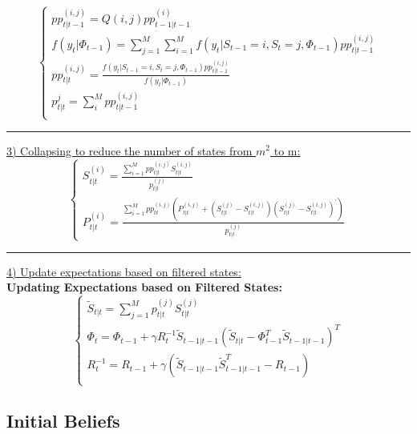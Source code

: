 \documentclass[12pt,reqno]{article}
\numberwithin{equation}{section}
\begin{document}
\begin{table}[H]
$$
\begin{cases}
pp_{t|t-1}^{(i,j)}=Q(i,j) pp_{t-1|t-1}^{(i)} \\
f(y_t|\Phi_{t-1}) = \sum_{j=1}^M \sum_{i=1}^M f(y_t | S_{t-1}=i, S_t=j, \Phi_{t-1} ) pp_{t|t-1}^{(i,j)} \\
pp_{t|t}^{(i,j)} = \frac{f(y_t | S_{t-1} = i, S_t = j, \Phi_{t-1}) pp_{t|t-1}^{(i,j)} } { f(y_t| \Phi_{t-1})} \\
p_{t|t}^{j} = \sum_{i}^M pp_{t|t-1}^{(i,j)}\\
\end{cases}
$$

\noindent\rule{\textwidth}{1pt}
\noindent
\underline{3) Collapsing to reduce the number of states from $m^2 $ to m:} \\
$$
\begin{cases}
{S}_{t|t}^{(i)} = \frac{\sum_{i=1}^M pp_{t|t}^{(i,j)} S_{t|t}^{(i,j)} } { p_{t|t}^{(j)}} \\
{P}_{t|t}^{(i)}= \frac{\sum_{i=1}^M pp_{tt}^{(i,j)} (P_{t|t}^{(i,j)} + (S_{t|t}^{(j)} - S_{t|t}^{(i,j)})(S_{t|t}^{(j)} - S_{t|t}^{(i,j)})^{\prime})}{p_{t|t}^{(j)}}
\end{cases}
$$

\noindent\rule{\textwidth}{1pt}
\noindent
\underline{4) Update expectations based on filtered states:} \\

\textbf{Updating Expectations based on Filtered States:}
$$
\begin{cases}
\tilde{S}_{t|t} = \sum_{j=1}^M p_{t|t}^{(j)} S_{t|t}^{(j)}\\
\Phi_t = \Phi_{t-1} + \gamma R_t^{-1} \tilde{S}_{t-1|t-1}(\tilde{S}_{t|t}- \Phi_{t-1}^{T} \tilde{S}_{t-1|t-1})^{T} \\
R_t^{-1} = R_{t-1} + \gamma (\tilde{S}_{t-1|t-1}\tilde{S}_{t-1|t-1}^{T} - R_{t-1}) \\
\end{cases}
$$

\end{table}


\subsection{Initial Beliefs}
\end{document}
